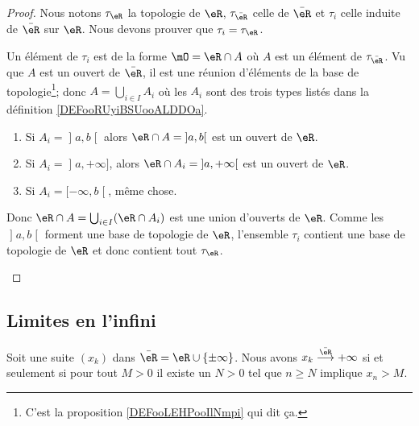\begin{proof}
	Nous notons \( \tau_{\eR}\) la topologie de \( \eR\), \( \tau_{\bar \eR}\) celle de \( \bar \eR\) et \( \tau_i\) celle induite de \( \bar \eR\) sur \( \eR\). Nous devons prouver que \( \tau_i=\tau_{\eR}\).

	\begin{subproof}
		Un élément de \( \tau_i\) est de la forme \( \mO=\eR\cap A\) où \( A\) est un élément de \( \tau_{\bar \eR}\). Vu que \( A\) est un ouvert de \( \bar \eR\), il est une réunion d'éléments de la base de topologie\footnote{C'est la proposition \ref{DEFooLEHPooIlNmpi} qui dit ça.}; donc \( A=\bigcup_{i\in I}A_i\) où les \( A_i\) sont des trois types listés dans la définition \ref{DEFooRUyiBSUooALDDOa}.
		\begin{enumerate}
			\item
			      Si \( A_i=\mathopen] a , b \mathclose[\) alors \( \eR\cap A=\mathopen] a , b \mathclose[\) est un ouvert de \( \eR\).
			\item Si \( A_i=\mathopen] a , +\infty \mathclose]\), alors \( \eR\cap A_i=\mathopen] a , +\infty \mathclose[\) est un ouvert de \( \eR\).
			\item Si \( A_i=\mathopen[ -\infty , b \mathclose[\), même chose.
		\end{enumerate}
		Donc \( \eR\cap A=\bigcup_{i\in I}(\eR\cap A_i)\) est une union d'ouverts de \( \eR\).
		Comme les \( \mathopen] a , b \mathclose[\) forment une base de topologie de \( \eR\), l'ensemble \( \tau_i\) contient une base de topologie de \( \eR\) et donc contient tout \( \tau_{\eR}\).
	\end{subproof}
\end{proof}

\subsection{Limites en l'infini}



\begin{proposition}
	Soit une suite \( (x_k)\) dans \( \bar \eR=\eR\cup\{ \pm\infty \}\). Nous avons \( x_k\stackrel{\bar \eR}{\longrightarrow}+\infty\) si et seulement si pour tout \( M>0\) il existe un \( N>0\) tel que \( n\geq N\) implique \( x_n>M\).
\end{proposition}

